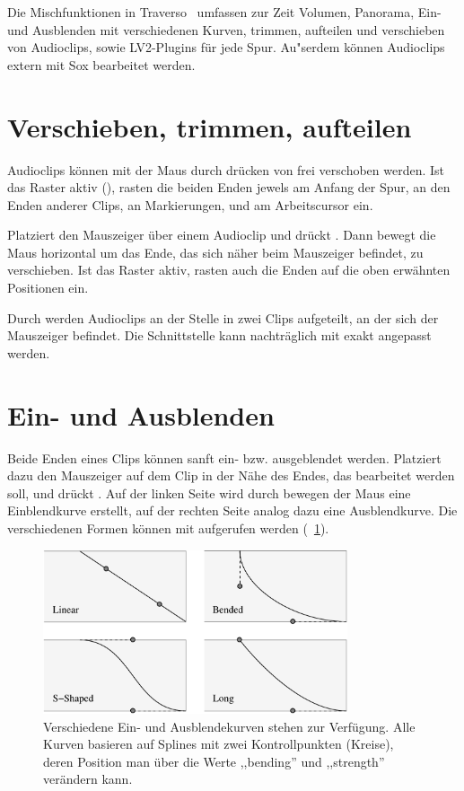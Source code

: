 Die Mischfunktionen in Traverso \Version\ umfassen zur Zeit Volumen, Panorama, Ein- und Ausblenden mit verschiedenen Kurven, trimmen, aufteilen und verschieben von Audioclips, sowie LV2-Plugins für jede Spur. Au"serdem können Audioclips extern mit Sox bearbeitet werden.

\section{Verschieben, trimmen, aufteilen}
Audioclips können mit der Maus durch drücken von  frei verschoben werden. Ist das Raster aktiv (), rasten die beiden Enden jewels am Anfang der Spur, an den Enden anderer Clips, an Markierungen, und am Arbeitscursor ein.

Platziert den Mauszeiger über einem Audioclip und drückt . Dann bewegt die Maus horizontal um das Ende, das sich näher beim Mauszeiger befindet, zu verschieben. Ist das Raster aktiv, rasten auch die Enden auf die oben erwähnten Positionen ein.

Durch  werden Audioclips an der Stelle in zwei Clips aufgeteilt, an der sich der Mauszeiger befindet. Die Schnittstelle kann nachträglich mit  exakt angepasst werden.

\section{Ein- und Ausblenden}
Beide Enden eines Clips können sanft ein- bzw. ausgeblendet werden. Platziert dazu den Mauszeiger auf dem Clip in der Nähe des Endes, das bearbeitet werden soll, und drückt . Auf der linken Seite wird durch bewegen der Maus eine Einblendkurve erstellt, auf der rechten Seite analog dazu eine Ausblendkurve. Die verschiedenen Formen können mit  aufgerufen werden (\FigB~\ref{fig_fades01}).


\begin{figure}[t]
 \centering\includegraphics[width=0.8\textwidth]{images/fades}
 \caption{Verschiedene Ein- und Ausblendekurven stehen zur Verfügung. Alle Kurven basieren auf Splines mit zwei Kontrollpunkten (Kreise), deren Position man über die Werte ,,bending'' und ,,strength'' verändern kann.}
 \label{fig_fades01}
\end{figure}

